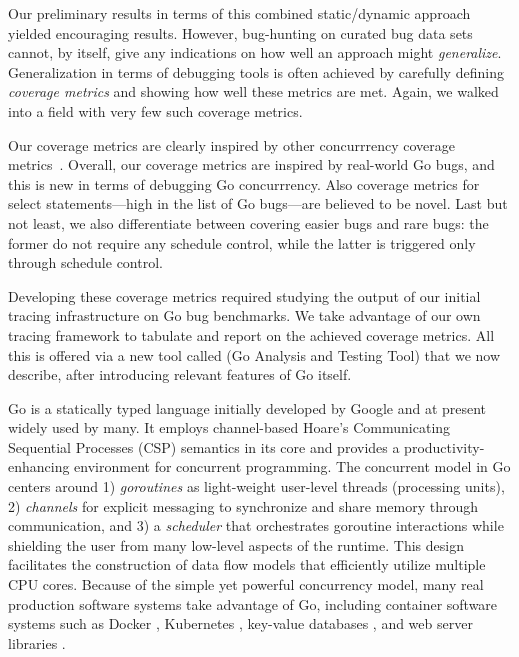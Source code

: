Our preliminary results in terms of this combined static/dynamic
approach yielded encouraging results.
%
However, bug-hunting on curated bug data sets cannot, by itself, give any
indications on how well an approach might {\em generalize}.
%
Generalization in terms of debugging tools is often achieved
by carefully defining {\em coverage metrics} and showing how
well these metrics are met.
%
Again, we walked into a field with very few such coverage metrics.


Our coverage metrics
are clearly inspired by other concurrrency coverage
metrics~\cite{cite,a,few,of,them}.
%
Overall, our coverage metrics are inspired by real-world Go bugs,
and this is new in terms of debugging Go concurrrency.
%
Also coverage metrics for select statements---high in the list of
Go bugs---are believed to be novel.
%
Last but not least, we also differentiate between covering
easier bugs and rare bugs: the former do not require any
schedule control, while the latter is triggered only through schedule
control.


Developing these coverage metrics required studying the output
of our initial
tracing infrastructure on Go bug benchmarks.
%
We take advantage of our own tracing framework to
tabulate and report on the achieved coverage metrics.
%
All this is offered via a new tool called \goat (Go Analysis and Testing Tool)
that we now describe, after introducing relevant features of Go
itself.


Go \cite{go} is a statically typed language initially developed by Google and at present widely used by many.
%
It employs channel-based Hoare's Communicating Sequential Processes (CSP) \cite{hoare-csp78} semantics in its core and provides a productivity-enhancing environment for concurrent programming.
%
The concurrent model in Go centers around
1) \textit{goroutines} as light-weight user-level threads (processing units),
2) \textit{channels} for explicit messaging to synchronize and share memory through communication, and
3) a \textit{scheduler} that orchestrates goroutine interactions while shielding
the user from
many low-level
aspects of the runtime.
%
This design
facilitates the
construction
of data flow models that efficiently utilize multiple CPU cores.
%
Because of the simple yet powerful concurrency model, many real production software systems take advantage of Go,
including
container software systems such as Docker \cite{merkel2014docker}, Kubernetes \cite{kubernetes},  key-value databases \cite{etcd}, and web server libraries \cite{grpc}.
%


